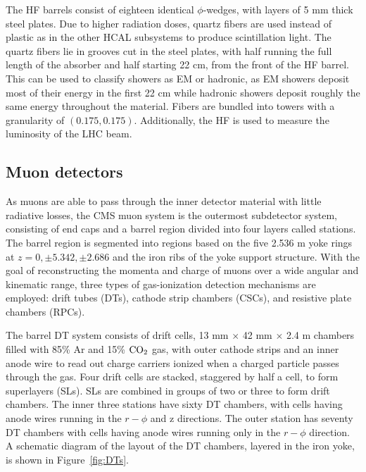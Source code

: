 \indent The HF barrels consist of eighteen identical $\phi$-wedges, with layers of 5 mm thick steel plates. Due to higher radiation doses, quartz fibers are used instead of plastic as in the other HCAL subsystems to produce scintillation light. The quartz fibers lie in grooves cut in the steel plates, with half running the full length of the absorber and half starting 22 cm, from the front of the HF barrel. This can be used to classify showers as EM or hadronic, as EM showers deposit most of their energy in the first 22 cm while hadronic showers deposit roughly the same energy throughout the material. Fibers are bundled into towers with a granularity of $(0.175, 0.175)$. Additionally, the HF is used to measure the luminosity of the LHC beam.

\subsection{Muon detectors}

As muons are able to pass through the inner detector material with little radiative losses, the CMS muon system is the outermost subdetector system, consisting of end caps and a barrel region divided into four layers called stations. The barrel region is segmented into regions based on the five 2.536 m yoke rings at $z = 0, \pm5.342, \pm2.686$ and the iron ribs of the yoke support structure. With the goal of reconstructing the momenta and charge of muons over a wide angular and kinematic range, three types of gas-ionization detection mechanisms are employed: drift tubes (DTs), cathode strip chambers (CSCs), and resistive plate chambers (RPCs). 

\indent The barrel DT system consists of drift cells, 13 mm $\times$ 42 mm $\times$ 2.4 m chambers filled with 85\% Ar and 15\% $\rm{CO}_2$ gas, with outer cathode strips and an inner anode wire to read out charge carriers ionized when a charged particle passes through the gas. Four drift cells are stacked, staggered by half a cell, to form superlayers (SLs). SLs are combined in groups of two or three to form drift chambers. The inner three stations have sixty DT chambers, with cells having anode wires running in the $r-\phi$ and z directions. The outer station has seventy DT chambers with cells having anode wires running only in the $r-\phi$ direction. A schematic diagram of the layout of the DT chambers, layered in the iron yoke, is shown in Figure~\ref{fig:DTs}.

